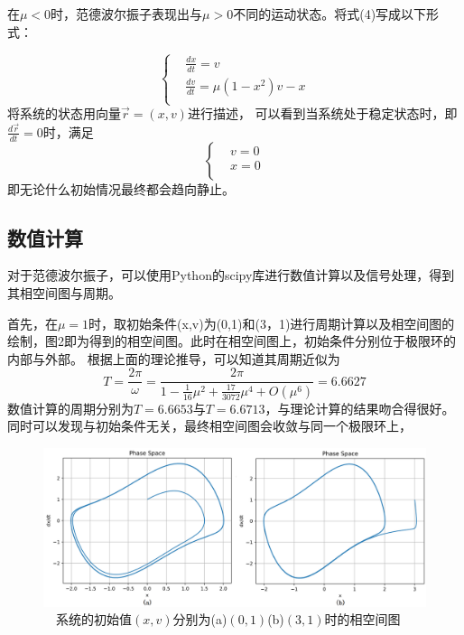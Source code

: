 \documentclass[10.5pt,oneside,a4paper]{article}
\theoremstyle{mystyle}
\begin{document}
在$\mu<0$时，范德波尔振子表现出与$\mu>0$不同的运动状态。将式(4)写成以下形式：

\begin{equation} 
    \left \{
    \begin{aligned}
    &\frac{dx}{dt}=v\\
    &\frac{dv}{dt}=\mu(1-x^2)v-x\\
    \end{aligned}
    \right.
\end{equation}
将系统的状态用向量$\vec{r}=(x,v)$进行描述，
可以看到当系统处于稳定状态时，即$\frac{d\vec{r}}{dt}=0$时，满足
\begin{equation} 
    \left \{
    \begin{aligned}
    &v=0\\
    &x=0\\
    \end{aligned}
    \right.
\end{equation}
即无论什么初始情况最终都会趋向静止。

\subsection{数值计算}

对于范德波尔振子，可以使用Python的scipy库进行数值计算以及信号处理，得到其相空间图与周期。

首先，在$\mu=1$时，取初始条件(x,v)为(0,1)和(3，1)进行周期计算以及相空间图的绘制，图2即为得到的相空间图。此时在相空间图上，初始条件分别位于极限环的内部与外部。
根据上面的理论推导，可以知道其周期近似为
\begin{equation}
    T=\frac{2\pi}{\omega}=\frac{2\pi}{1-\frac{1}{16}\mu^2+\frac{17}{3072}\mu^4+O(\mu^6)}=6.6627
\end{equation}
数值计算的周期分别为$T=6.6653$与$T=6.6713$，与理论计算的结果吻合得很好。同时可以发现与初始条件无关，最终相空间图会收敛与同一个极限环上，

\begin{figure}
    \centering
    \includegraphics[width=0.8\linewidth]{1inout.png}
    \caption{$\quad$系统的初始值$(x,v)$分别为(a)$(0,1)$(b)$(3,1)$时的相空间图}
\end{figure}
  
\end{document}

